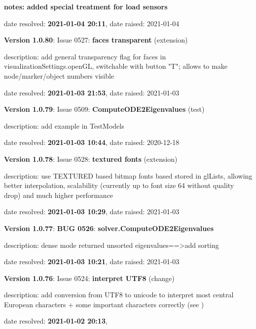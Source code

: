   \item {\small \bf notes: added special treatment for load sensors}
  \item   date resolved: {\bf 2021-01-04 20:11},
date raised: 2021-01-04   \ei
  \item {\bf Version 1.0.80}: \vspace{-6pt} 
  Issue 0527: {\bf faces transparent}
(extension)
  \bi
  \item {\small description: add general transparency flag for faces in visualizationSettings.openGL, switchable with button "T"; allows to make node/marker/object numbers visible}
  \item   date resolved: {\bf 2021-01-03 21:53},
date raised: 2021-01-03   \ei
  \item {\bf Version 1.0.79}: \vspace{-6pt} 
  Issue 0509: {\bf ComputeODE2Eigenvalues}
(test)
  \bi
  \item {\small description: add example in TestModels}
  \item   date resolved: {\bf 2021-01-03 10:44},
date raised: 2020-12-18   \ei
  \item {\bf Version 1.0.78}: \vspace{-6pt} 
  Issue 0528: {\bf textured fonts}
(extension)
  \bi
  \item {\small description: use TEXTURED based bitmap fonts based stored in glLists, allowing better interpolation, scalability (currently up to font size 64 without quality drop) and much higher performance}
  \item   date resolved: {\bf 2021-01-03 10:29},
date raised: 2021-01-03   \ei
  \item {\bf Version 1.0.77}: \vspace{-6pt} 
{\bf \color{warningRed}  BUG 0526}: {\bf solver.ComputeODE2Eigenvalues}
  \bi
  \item {\small description: dense mode returned unsorted eigenvalues==>add sorting}
  \item   date resolved: {\bf 2021-01-03 10:21},
date raised: 2021-01-03   \ei
  \item {\bf Version 1.0.76}: \vspace{-6pt} 
  Issue 0524: {\bf interpret UTF8}
(change)
  \bi
  \item {\small description: add conversion from UTF8 to unicode to interpret most central European characters + some important characters correctly (see )}
  \item   date resolved: {\bf 2021-01-02 20:13},
